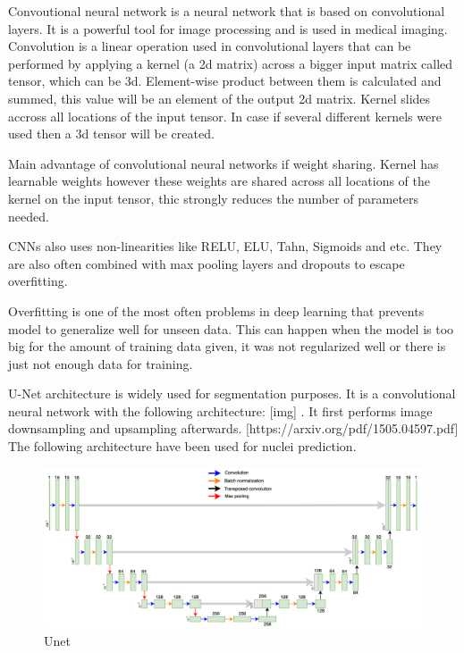 Convoutional neural network is a neural network that is based on convolutional layers. It is a powerful tool for image processing and is used in medical imaging. Convolution is a linear operation used in convolutional layers that can be performed by applying a kernel (a 2d matrix) across a bigger input matrix called tensor, which can be 3d. Element-wise product between them is calculated and summed, this value will be an element of the output 2d matrix. Kernel slides accross all locations of the input tensor. In case if several different kernels were used then a 3d tensor will be created. 

Main advantage of convolutional neural networks if weight sharing. Kernel has learnable weights however these weights are shared across all locations of the kernel on the input tensor, thic strongly reduces the number of parameters needed.

CNNs also uses non-linearities like RELU, ELU, Tahn, Sigmoids and etc. They are also often combined with max pooling layers and dropouts to escape overfitting. 

Overfitting is one of the most often problems in deep learning that prevents model to generalize well for unseen data. This can happen when the model is too big for the amount of training data given, it was not regularized well or there is just not enough data for training. 

U-Net architecture is widely used for segmentation purposes. It is a convolutional neural network with the following architecture: [img] . It first performs image downsampling and upsampling afterwards.
[https://arxiv.org/pdf/1505.04597.pdf] The following architecture have been used for nuclei prediction. 
\begin{figure}[htb]
	\begin{center}
		\includegraphics[width=\linewidth]{bilder/Unet.png}
		\caption{Unet}\label{fig:unet}
	\end{center}
\end{figure}
